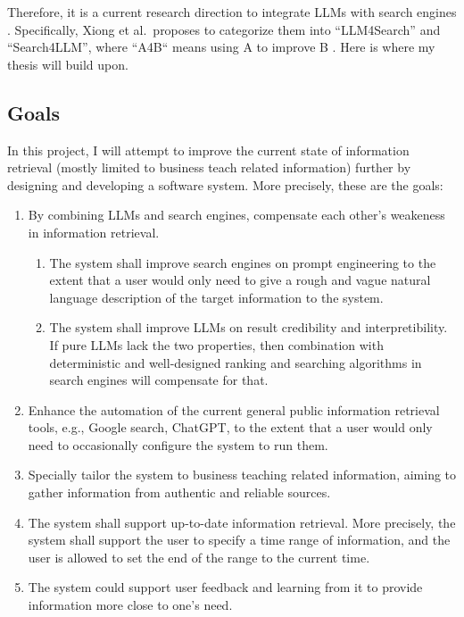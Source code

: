 \documentclass[project-plan]{report-template}
\begin{document}
Therefore, it is a current research direction to integrate LLMs with search
engines \cite{llm.meet.search.1, llm.meet.search.2, llm.meet.search.3}.
Specifically, Xiong et al.\ proposes to categorize them into ``LLM4Search'' and
``Search4LLM'', where ``A4B`` means using A to improve B
\cite{llm.meet.search.1}. Here is where my thesis will build upon.  

\subsection{Goals}
In this project, I will attempt to improve the current state of information
retrieval (mostly limited to business teach related information) further by
designing and developing a software
system. More precisely, these are the goals:
\begin{enumerate}
	\item By combining LLMs and search engines, compensate each other's
		weakeness in information retrieval.
		\begin{enumerate}
		\item The system shall improve search engines on prompt engineering to
			the extent that a user would only need to give a rough and vague
			natural language description of the target information to the
			system.
		\item The system shall improve LLMs on result credibility and
			interpretibility. If pure LLMs lack the two properties, then
			combination with deterministic and well-designed ranking and
			searching algorithms in search engines will compensate for that.
		\end{enumerate}
	\item Enhance the automation of the current general public information
		retrieval tools, e.g., Google search, ChatGPT, to the extent that a
		user would only need to occasionally configure the system to run them.
	\item Specially tailor the system to business teaching related information,
		aiming to gather information from authentic and reliable sources.
	\item The system shall support up-to-date information retrieval. More
		precisely, the system shall support the user to specify a time range of
		information, and the user is allowed to set the end of the range to the
		current time.
	\item The system could support user feedback and learning from it to
		provide information more close to one's need.
\end{enumerate}
\end{document}
